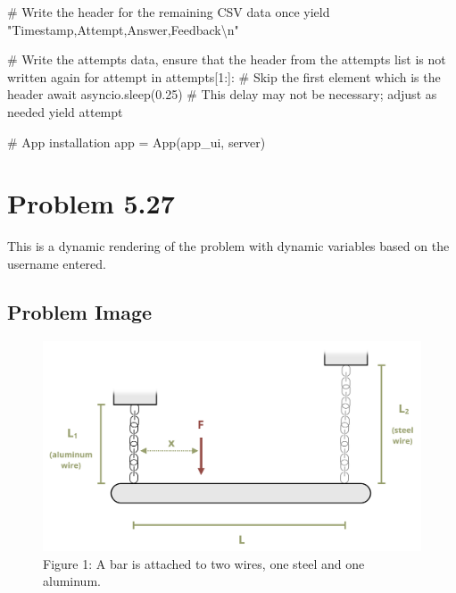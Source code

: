 \documentclass[
  letterpaper,
  DIV=11,
  numbers=noendperiod]{scrreprt}
\newenvironment{Shaded}{\begin{snugshade}}{\end{snugshade}}
\newcommand{\NormalTok}[1]{\textcolor[rgb]{0.00,0.23,0.31}{#1}}
\begin{document}
\begin{Shaded}
\begin{Highlighting}[]
\NormalTok{        \# Write the header for the remaining CSV data once}
\NormalTok{        yield "Timestamp,Attempt,Answer,Feedback\textbackslash{}n"}
        
\NormalTok{        \# Write the attempts data, ensure that the header from the attempts list is not written again}
\NormalTok{        for attempt in attempts[1:]:  \# Skip the first element which is the header}
\NormalTok{            await asyncio.sleep(0.25)  \# This delay may not be necessary; adjust as needed}
\NormalTok{            yield attempt}


\NormalTok{\# App installation}
\NormalTok{app = App(app\_ui, server)}
\end{Highlighting}
\end{Shaded}

\chapter*{Problem 5.27}\label{problem-5.27}


This is a dynamic rendering of the problem with dynamic variables based
on the username entered.

\section*{Problem Image}\label{problem-image-20}


\begin{figure}[H]

{\centering \includegraphics{images/191.png}

}

\caption{Figure 1: A bar is attached to two wires, one steel and one
aluminum.}

\end{figure}%
\end{document}
